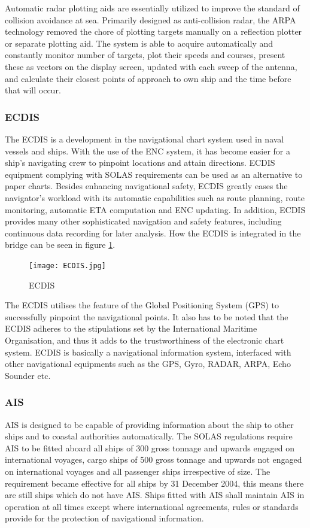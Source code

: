 Automatic radar plotting aids are essentially utilized to improve the standard of collision avoidance at sea. Primarily designed as anti-collision radar, the ARPA technology removed the chore of plotting targets manually on a reflection plotter or separate plotting aid. The system is able to acquire automatically and constantly monitor number of targets, plot their speeds and courses, present these as vectors on the display screen, updated with each sweep of the antenna, and calculate their closest points of approach to own ship and the time before that will occur.

\subsubsection{\acf{ECDIS}}
The \acf{ECDIS} is a development in the navigational chart system used in naval vessels and ships. With the use of the \acf{ENC} system, it has become easier for a ship’s navigating crew to pinpoint locations and attain directions. ECDIS equipment complying with SOLAS requirements can be used as an alternative to paper charts. Besides enhancing navigational safety, ECDIS greatly eases the navigator’s workload with its automatic capabilities such as route planning, route monitoring, automatic ETA computation and ENC updating. In addition, ECDIS provides many other sophisticated navigation and safety features, including continuous data recording for later analysis. How the ECDIS is integrated in the bridge can be seen in figure \ref{fig:ECDIS}.

\begin{figure}[H]
	\centering
	\texttt{[image: ECDIS.jpg]}
	\caption{\acf{ECDIS}}
	\label{fig:ECDIS}
\end{figure}

The ECDIS utilises the feature of the Global Positioning System (GPS) to successfully pinpoint the navigational points. It also has to be noted that the ECDIS adheres to the stipulations set by the International Maritime Organisation, and thus it adds to the trustworthiness of the electronic chart system. ECDIS is basically a navigational information system, interfaced with other navigational equipments such as the GPS, Gyro, RADAR, ARPA, Echo Sounder etc.

\subsubsection{\acf{AIS}}
\ac{AIS} is designed to be capable of providing information about the ship to other ships and to coastal authorities automatically. The \ac{SOLAS} regulations require \ac{AIS} to be fitted aboard all ships of 300 gross tonnage and upwards engaged on international voyages, cargo ships of 500 gross tonnage and upwards not engaged on international voyages and all passenger ships irrespective of size. The requirement became effective for all ships by 31 December 2004, this means there are still ships which do not have \ac{AIS}. Ships fitted with \ac{AIS} shall maintain \ac{AIS} in operation at all times except where international agreements, rules or standards provide for the protection of navigational information.

